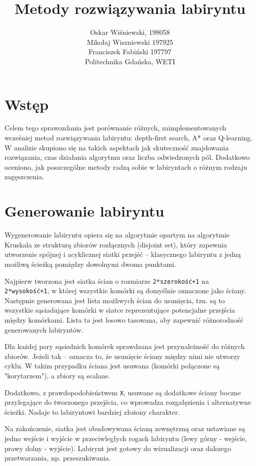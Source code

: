 \documentclass[a4paper,12pt]{article}
\title{\textbf{Metody rozwiązywania labiryntu}}
\author{Oskar Wiśniewski, 198058\\
 Mikołaj Wiszniewski 197925\\
 Franciszek Fabiński 197797 \\[0.5em]
Politechnika Gdańska, WETI}
\begin{document}
\maketitle

\section{Wstęp}
	Celem tego sprawozdania jest porównanie różnych, zaimplementowanych wcześniej metod rozwiązywania labiryntu: depth-first search, A* oraz Q-learning. W analizie skupiono się na takich aspektach jak skuteczność znajdowania rozwiązania, czas działania algorytmu oraz liczba odwiedzonych pól. Dodatkowo oceniono, jak poszczególne metody radzą sobie w labiryntach o różnym rodzaju zagęszczenia.

\section{Generowanie labiryntu}
	Wygenerowanie labiryntu opiera się na algorytmie opartym na algorytmie Kruskala ze strukturą zbiorów rozłącznych (disjoint set), który zapewnia utworzenie spójnej i acyklicznej siatki przejść – klasycznego labiryntu z jedną możliwą ścieżką pomiędzy dowolnymi dwoma punktami.
	\par Najpierw tworzona jest siatka ścian o rozmiarze \texttt{2*szerokość+1} na \texttt{2*wysokość+1}, w której wszystkie komórki są domyślnie oznaczone jako ściany. Następnie generowana jest lista możliwych ścian do usunięcia, tzn. są to wszystkie sąsiadujące komórki w siatce reprezentujące potencjalne przejścia między komórkami. Lista ta jest losowo tasowana, aby zapewnić różnorodność generowanych labiryntów.
	\par Dla każdej pary sąsiednich komórek sprawdzana jest przynależność do różnych zbiorów. Jeżeli tak – oznacza to, że usunięcie ściany między nimi nie utworzy cyklu. W takim przypadku ściana jest usuwana (komórki połączone są "korytarzem"), a zbiory są scalane.
	\par Dodatkowo, z prawdopodobieństwem \texttt{X}, usuwane są dodatkowe ściany boczne przylegające do tworzonego przejścia, co wprowadza rozgałęzienia i alternatywne ścieżki. Nadaje to labiryntowi bardziej złożony charakter.
	\par Na zakończenie, siatka jest obudowywana ścianą zewnętrzną oraz ustawiane są jedno wejście i wyjście w przeciwległych rogach labiryntu (lewy górny - wejście, prawy dolny - wyjście). Labirynt jest gotowy do wizualizacji oraz dalszego przetwarzania, np. przeszukiwania.
\end{document}

